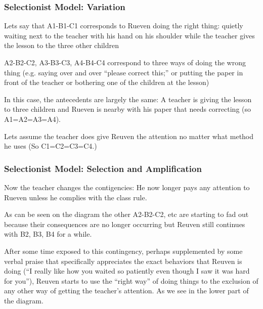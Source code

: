 \documentclass[12pt, handout, notes=show]{beamer}
\begin{document}
\begin{frame}
  \frametitle{Selectionist Model: Variation}
  \begin{itemize}
    \small{
    \item Lets say that A1-B1-C1 corresponds to Rueven doing the right
      thing: quietly waiting next to the teacher with his hand on his
      shoulder while the teacher gives the lesson to the three other
      children
    \item A2-B2-C2, A3-B3-C3, A4-B4-C4 correspond to three ways of
      doing the wrong thing (e.g. saying over and over ``please
      correct this;'' or putting the paper in front of the teacher or
      bothering one of the children at the lesson)
    \item In this case, the antecedents are largely the same: A
      teacher is giving the lesson to three children and Rueven is
      nearby with his paper that needs correcting (so A1=A2=A3=A4).
    \item Lets assume the teacher does give Reuven the attention no
      matter what method he uses (So C1=C2=C3=C4.)  }
  \end{itemize}

\end{frame}

\begin{frame}
  \frametitle{Selectionist Model: Selection and Amplification}
  \begin{itemize}
    \small{
    \item Now the teacher changes the contigencies: He now longer pays
      any attention to Rueven unless he complies with the class rule.
    \item As can be seen on the diagram the other A2-B2-C2, etc are
      starting to fad out because their consequences are no longer
      occurring but Reuven still continues with B2, B3, B4 for a
      while.
    \item After some time exposed to this contingency, perhaps
      supplemented by some verbal praise that specifically appreciates
      the exact behaviors that Reuven is doing (``I really like how
      you waited so patiently even though I saw it was hard for
      you''), Reuven starts to use the ``right way'' of doing things
      to the exclusion of any other way of getting the teacher's
      attention. As we see in the lower part of the diagram. }
  \end{itemize}

\end{frame}
\end{document}
